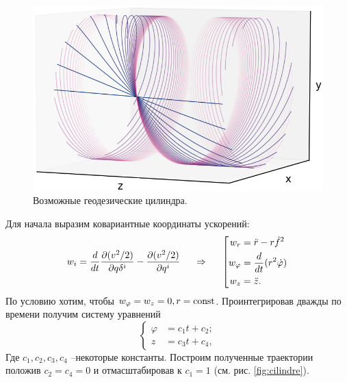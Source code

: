 \begin{figure}
  \begin{center}
        \vspace{-5 mm}
        \includegraphics[width=0.9\linewidth]{img/T6_v2.png}
  \end{center}
    \caption{Возможные геодезические цилиндра.}
    \label{fig:cilindre}
\end{figure}

Для начала выразим ковариантные координаты ускорений:
$$
    w_i = \frac{d}{dt} \frac{\partial (v^2/2)}{\partial q\delta^i} - \frac{\partial (v^2/2)}{\partial q^i} 
    \hspace{0.5cm} \Rightarrow \hspace{0.5cm} 
    \left[\begin{aligned}
        w_r &= \ddot{r} - r \dot{f}^2 \\
        w_\varphi &= \frac{d}{dt} (r^2 \dot{\varphi}) \\
        w_z &= \ddot{z}.
    \end{aligned}\right.
$$
По условию хотим, чтобы $w_\varphi = w_z = 0, r=\text{const}$. Проинтегрировав дважды по времени получим систему уравнений
$$
    \left\{\begin{aligned}
        \varphi &=  c_1 t + c_2;\\
        z &= c_3 t + c_4,
    \end{aligned}\right.
$$
Где $c_1, c_2, c_3, c_4$ --некоторые константы. Построим полученные траектории положив $c_2 = c_4 = 0$ и отмасштабировав к $c_1 = 1$ (см. рис. \eqref{fig:cilindre}).


